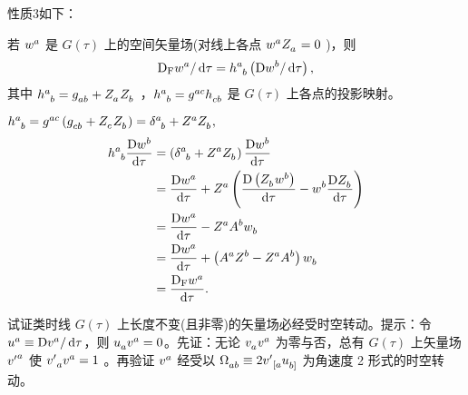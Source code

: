 \begin{xiti}
    \begin{zm}
    	性质3如下：
    	\begin{Property}
    		若 $\tensor{w}{^a}$ 是 $G(\tau)$ 上的空间矢量场(对线上各点 $\tensor{w}{^a} \tensor{Z}{_a} = 0$ )，则 \[ \Fdd{\tensor{w}{^a}} = \tensor{h}{^a_b} \left( \Ddd{\tensor{w}{^b}} \right), \] 其中 $\tensor{h}{^a_b} = \tensor{g}{_a_b} + \tensor{Z}{_a} \tensor{Z}{_b}$ ，$\tensor{h}{^a_b} = \tensor{g}{^a^c} \tensor{h}{_c_b}$ 是 $G(\tau)$ 上各点的投影映射。
    	\end{Property}
    	\begin{Proof}
    		$\tensor{h}{^a_b} = \tensor{g}{^a^c} \left( \tensor{g}{_c_b} + \tensor{Z}{_c} \tensor{Z}{_b} \right) = \tensor{\delta}{^a_b} + \tensor{Z}{^a} \tensor{Z}{_b},$
    		\begin{align*}
    		\tensor{h}{^a_b} \Dd{\tensor{w}{^b}} &= \left( \tensor{\delta}{^a_b} + \tensor{Z}{^a} \tensor{Z}{_b} \right) \Dd{\tensor{w}{^b}}\\
    		&= \Dd{\tensor{w}{^a}} + \tensor{Z}{^a} \left( \Dd{\left( \tensor{Z}{_b} \tensor{w}{^b} \right)} - \tensor{w}{^b} \Dd{\tensor{Z}{_b}} \right)\\
    		&= \Dd{\tensor{w}{^a}} - \tensor{Z}{^a} \tensor{A}{^b} \tensor{w}{_b}\\
    		&= \Dd{\tensor{w}{^a}} + \left(\tensor{A}{^a} \tensor{Z}{^b} - \tensor{Z}{^a} \tensor{A}{^b}\right) \tensor{w}{_b}\\
    		&= \Fd{\tensor{w}{^a}}.
    		\end{align*}
    	\end{Proof}
    \end{zm}
    
    \item 试证类时线 $G(\tau)$ 上长度不变(且非零)的矢量场必经受时空转动。提示：令 $\tensor{u}{^a} \equiv \Ddd{\tensor{v}{^a}}$，则 $\tensor{u}{_a} \tensor{v}{^a}=0$。先证：无论 $\tensor{v}{_a}\tensor{v}{^a}$ 为零与否，总有 $G(\tau)$ 上矢量场 $\tensor{{v'}}{^a}$ 使 $\tensor{{v'}}{_a} \tensor{v}{^a} = 1$ 。再验证 $\tensor{v}{^a}$ 经受以 $\tensor{\Omega}{_a_b} \equiv 2 \tensor{{v'}}{_{[a}} \tensor{u}{_{b]}}$ 为角速度 2 形式的时空转动。
    

\end{xiti}
